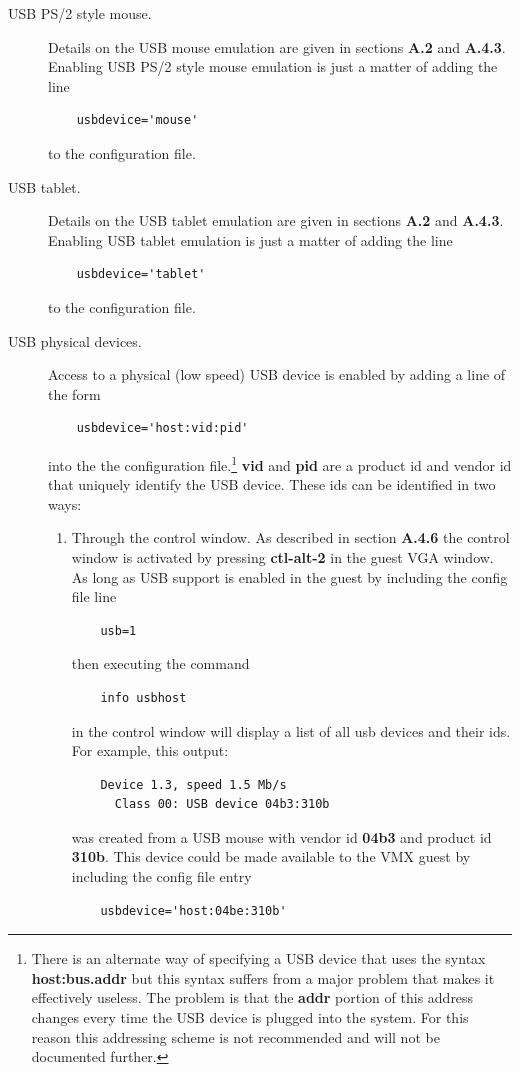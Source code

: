 \documentclass[11pt,twoside,final,openright]{report}
\begin{document}
\begin{description}
\item[USB PS/2 style mouse.]
Details on the USB mouse emulation are
given in sections
\textbf{A.2}
and
\textbf{A.4.3}.
Enabling USB PS/2 style mouse emulation
is just a matter of adding the line

{\small
\begin{verbatim}
    usbdevice='mouse'
\end{verbatim}
}

to the configuration file.
\item[USB tablet.]
Details on the USB tablet emulation are
given in sections
\textbf{A.2}
and
\textbf{A.4.3}.
Enabling USB tablet emulation
is just a matter of adding the line

{\small
\begin{verbatim}
    usbdevice='tablet'
\end{verbatim}
}

to the configuration file.
\item[USB physical devices.]
Access to a physical (low speed) USB device
is enabled by adding a line of the form

{\small
\begin{verbatim}
    usbdevice='host:vid:pid'
\end{verbatim}
}

into the the configuration file.\footnote{
There is an alternate
way of specifying a USB device that
uses the syntax
\textbf{host:bus.addr}
but this syntax suffers from
a major problem that makes
it effectively useless.
The problem is that the
\textbf{addr}
portion of this address
changes every time the USB device
is plugged into the system.
For this reason this addressing
scheme is not recommended and
will not be documented further.
}
\textbf{vid}
and
\textbf{pid}
are a
product id and
vendor id
that uniquely identify
the USB device.
These ids can be identified
in two ways:

\begin{enumerate}
\item Through the control window.
As described in section
\textbf{A.4.6}
the control window
is activated by pressing
\textbf{ctl-alt-2}
in the guest VGA window.
As long as USB support is
enabled in the guest by including
the config file line
{\small
\begin{verbatim}
    usb=1
\end{verbatim}
}
then executing the command
{\small
\begin{verbatim}
    info usbhost
\end{verbatim}
}
in the control window
will display a list of all
usb devices and their ids.
For example,
this output:
{\small
\begin{verbatim}
    Device 1.3, speed 1.5 Mb/s
      Class 00: USB device 04b3:310b
\end{verbatim}
}
was created from a USB mouse with
vendor id
\textbf{04b3}
and product id
\textbf{310b}.
This device could be made available
to the VMX guest by including the
config file entry
{\small
\begin{verbatim}
    usbdevice='host:04be:310b'
\end{verbatim}
}


\end{enumerate}
\end{description}
\end{document}
